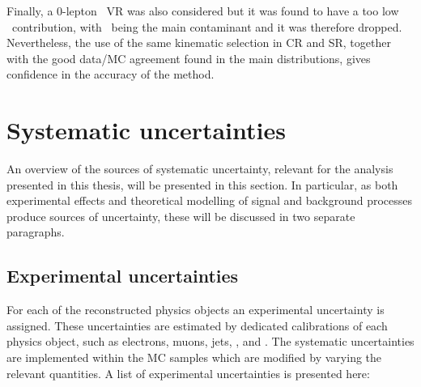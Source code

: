 		Finally, a $0$-lepton \ttgamma\ \ac{VR} was also considered but it was found to have a too low \ttgamma\ contribution, with \gammajets\ being the main contaminant and it was therefore dropped. Nevertheless, the use of the same kinematic selection in \ac{CR}  and \ac{SR}, together with the good data/\ac{MC} agreement found in the main distributions, gives confidence in the accuracy of the method.



	\section{Systematic uncertainties}
	\label{sec:syst_unc}

		An overview of the sources of systematic uncertainty, relevant for the analysis presented in this thesis, will be presented in this section. In particular, as both experimental effects and theoretical modelling of signal and background processes produce sources of uncertainty, these will be discussed in two separate paragraphs.

		\subsection{Experimental uncertainties}
			
			For each of the reconstructed physics objects an experimental uncertainty is assigned. These uncertainties are estimated by dedicated calibrations of each physics object, such as electrons, muons, jets, \bjs, and \met. The systematic uncertainties are implemented within the MC samples which are modified by varying the relevant quantities. A list of experimental uncertainties is presented here:

